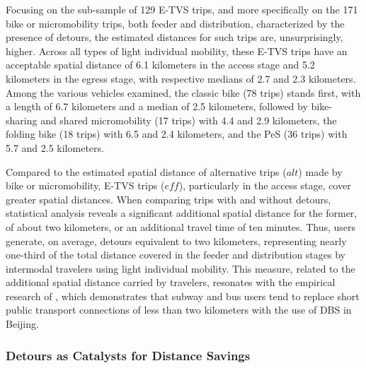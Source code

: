 \begin{refsegment}
Focusing on the sub-sample of 129 \acrshort{E-TVS} trips, and more specifically on the 171 bike or micromobility trips, both feeder and distribution, characterized by the presence of detours, the estimated distances for such trips are, unsurprisingly, higher. Across all types of light individual mobility, these \acrshort{E-TVS} trips have an acceptable spatial distance of 6.1 kilometers in the access stage and 5.2 kilometers in the egress stage, with respective medians of 2.7 and 2.3 kilometers. Among the various vehicles examined, the classic bike (78 trips) stands first, with a length of 6.7 kilometers and a median of 2.5 kilometers, followed by bike-sharing and shared micromobility (17 trips) with 4.4 and 2.9 kilometers, the folding bike (18 trips) with 6.5 and 2.4 kilometers, and the \acrshort{PeS} (36 trips) with 5.7 and 2.5 kilometers.%

Compared to the estimated spatial distance of alternative trips (\(alt\)) made by bike or micromobility, \acrshort{E-TVS} trips (\(eff\)), particularly in the access stage, cover greater spatial distances. When comparing trips with and without detours, statistical analysis reveals a significant additional spatial distance for the former, of about two kilometers, or an additional travel time of ten minutes. Thus, users generate, on average, detours equivalent to two kilometers, representing nearly one-third of the total distance covered in the feeder and distribution stages by intermodal travelers using light individual mobility. This measure, related to the additional spatial distance carried by travelers, resonates with the empirical research of \textcolor{blue}{\textcite[11]{jin_competition_2019}}, which demonstrates that subway and bus users tend to replace short public transport connections of less than two kilometers with the use of \acrshort{DBS} in Beijing.%

\subsubsection*{Detours as Catalysts for Distance Savings
    \label{chap5:detours-gains-de-temps}
}


\end{refsegment}
